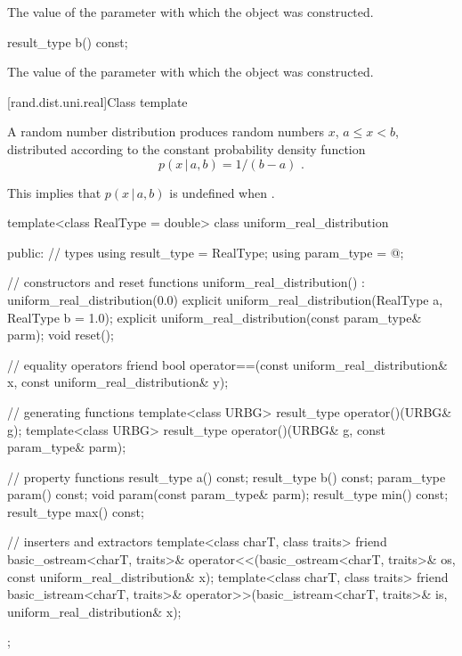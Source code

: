 \begin{itemdescr}
\pnum
\returns
The value of the  parameter
 with which the object was constructed.
\end{itemdescr}

%
\begin{itemdecl}
result_type b() const;
\end{itemdecl}

\begin{itemdescr}
\pnum
\returns
The value of the  parameter
 with which the object was constructed.
\end{itemdescr}


[rand.dist.uni.real]{Class template }%
%

\pnum
A  random number distribution
produces random numbers $x$,
$a \leq x < b$,
distributed according to
the constant probability density function%
\[ p(x\,|\,a,b) = 1 / (b - a) \text{ .} \]
\begin{note}
This implies that $p(x\,|\,a,b)$ is undefined when .
\end{note}

%
%
\begin{codeblock}
template<class RealType = double>
  class uniform_real_distribution {
  public:
    // types
    using result_type = RealType;
    using param_type  = @\unspec@;

    // constructors and reset functions
    uniform_real_distribution() : uniform_real_distribution(0.0) {}
    explicit uniform_real_distribution(RealType a, RealType b = 1.0);
    explicit uniform_real_distribution(const param_type& parm);
    void reset();

    // equality operators
    friend bool operator==(const uniform_real_distribution& x,
                           const uniform_real_distribution& y);

    // generating functions
    template<class URBG>
      result_type operator()(URBG& g);
    template<class URBG>
      result_type operator()(URBG& g, const param_type& parm);

    // property functions
    result_type a() const;
    result_type b() const;
    param_type param() const;
    void param(const param_type& parm);
    result_type min() const;
    result_type max() const;

    // inserters and extractors
    template<class charT, class traits>
      friend basic_ostream<charT, traits>&
        operator<<(basic_ostream<charT, traits>& os, const uniform_real_distribution& x);
    template<class charT, class traits>
      friend basic_istream<charT, traits>&
        operator>>(basic_istream<charT, traits>& is, uniform_real_distribution& x);
  };
\end{codeblock}


